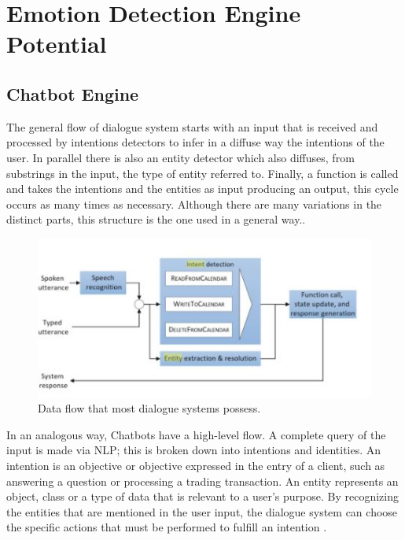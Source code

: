 \documentclass[	DIV=calc,%
							paper=letter,%
							fontsize=12pt%
                            ]{scrartcl}	 					%
\begin{document}
\section{\label{sec:level1}Emotion Detection Engine Potential}

\subsection{\label{sec:level1}Chatbot Engine}
The general flow of dialogue system starts with an input that is received and processed by intentions detectors to infer in a diffuse way the intentions of the user. In parallel there is also an entity detector which also diffuses, from substrings in the input, the type of entity referred to. Finally, a function is called and takes the intentions and the entities as input producing an output, this cycle occurs as many times as necessary. Although there are many variations in the distinct parts, this structure is the one used in a general way.\cite{lee2015natural_sn}.


\begin{figure}[H]
\centering
\includegraphics[scale=1.5]{img/Pipeline.JPG}
\caption{Data flow that most dialogue systems possess.}
\label{DiagIntent}
\end{figure}

In an analogous way, Chatbots have a high-level flow. A complete query of the input is made via NLP; this is broken down into intentions and identities. An intention is an objective or objective expressed in the entry of a client, such as answering a question or processing a trading transaction. An entity represents an object, class or a type of data that is relevant to a user's purpose. By recognizing the entities that are mentioned in the user input, the dialogue system can choose the specific actions that must be performed to fulfill an intention \cite{lee2015natural_sn} \cite{7419068Perzylo_sn}.
\end{document}
